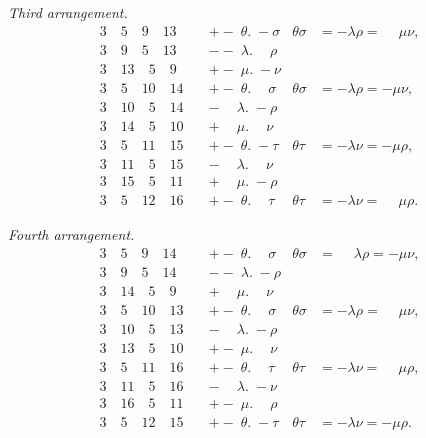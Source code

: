\documentclass[11pt,a4paper,english]{article}
\theoremstyle{plain}
\begin{document}
\newpage
\textit{Third arrangement.}
\begin{align*}
3\quad 5\quad 9\quad 13\quad &+ -\; \theta.\; -\sigma & \theta\sigma &= -\lambda\rho = \phantom{-}\mu\nu, \\
3\quad 9\quad 5\quad 13\quad &--\; \lambda.\phantom{-}\rho & & \\
3\quad 13\quad 5\quad 9\quad &+ -\; \mu.\; -\nu & & \\[4pt]
3\quad 5\quad 10\quad 14\quad &+ -\; \theta.\phantom{-}\sigma & \theta\sigma &= -\lambda\rho = -\mu\nu, \\
3\quad 10\quad 5\quad 14\quad &-\phantom{-}\lambda.\; -\rho & & \\
3\quad 14\quad 5\quad 10\quad &+\phantom{-}\mu.\phantom{-}\nu & & \\[4pt]
3\quad 5\quad 11\quad 15\quad &+ -\; \theta.\; -\tau & \theta\tau &= -\lambda\nu = -\mu\rho, \\
3\quad 11\quad 5\quad 15\quad &-\phantom{-}\lambda.\phantom{-}\nu & & \\
3\quad 15\quad 5\quad 11\quad &+\phantom{-}\mu.\; -\rho & & \\[4pt]
3\quad 5\quad 12\quad 16\quad &+ -\; \theta.\phantom{-}\tau & \theta\tau &= -\lambda\nu = \phantom{-}\mu\rho.
\end{align*}

\textit{Fourth arrangement.}
\begin{align*}
3\quad 5\quad 9\quad 14\quad &+ -\; \theta.\phantom{-}\sigma & \theta\sigma &= \phantom{-}\lambda\rho = -\mu\nu, \\
3\quad 9\quad 5\quad 14\quad &--\; \lambda.\; -\rho & & \\
3\quad 14\quad 5\quad 9\quad &+\phantom{-}\mu.\phantom{-}\nu & & \\[4pt]
3\quad 5\quad 10\quad 13\quad &+ -\; \theta.\phantom{-}\sigma & \theta\sigma &= -\lambda\rho = \phantom{-}\mu\nu, \\
3\quad 10\quad 5\quad 13\quad &-\phantom{-}\lambda.\; -\rho & & \\
3\quad 13\quad 5\quad 10\quad &+ -\; \mu.\phantom{-}\nu & & \\[4pt]
3\quad 5\quad 11\quad 16\quad &+ -\; \theta.\phantom{-}\tau & \theta\tau &= -\lambda\nu = \phantom{-}\mu\rho, \\
3\quad 11\quad 5\quad 16\quad &-\phantom{-}\lambda.\; -\nu & & \\
3\quad 16\quad 5\quad 11\quad &+ -\; \mu.\phantom{-}\rho & & \\[4pt]
3\quad 5\quad 12\quad 15\quad &+ -\; \theta.\; -\tau & \theta\tau &= -\lambda\nu = -\mu\rho.
\end{align*}
\end{document}
